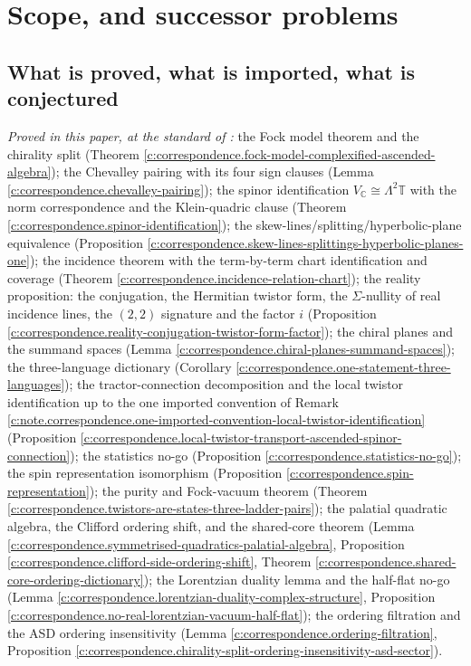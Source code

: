 \documentclass[11pt]{article}
\theoremstyle{definition}
\theoremstyle{plain}
\providecommand{\C}{}\renewcommand{\C}{\mathbb{C}}
\providecommand{\T}{}\renewcommand{\T}{\mathbb{T}}
\begin{document}
\section{Scope, and successor problems}

\subsection*{What is proved, what is imported, what is conjectured}
\label{c:note.correspondence.setting-what-proved-what-imported-what}
\emph{Proved in this paper, at the standard of \cite{ButlerT1}:} the Fock model theorem and the chirality split (Theorem \ref{c:correspondence.fock-model-complexified-ascended-algebra}); the Chevalley pairing with its four sign clauses (Lemma \ref{c:correspondence.chevalley-pairing}); the spinor identification $V_\C \cong \Lambda^2\T$ with the norm correspondence and the Klein-quadric clause (Theorem \ref{c:correspondence.spinor-identification}); the skew-lines/splitting/hyperbolic-plane equivalence (Proposition \ref{c:correspondence.skew-lines-splittings-hyperbolic-planes-one}); the incidence theorem with the term-by-term chart identification and coverage (Theorem \ref{c:correspondence.incidence-relation-chart}); the reality proposition: the conjugation, the Hermitian twistor form, the $\Sigma$-nullity of real incidence lines, the $(2,2)$ signature and the factor $i$ (Proposition \ref{c:correspondence.reality-conjugation-twistor-form-factor}); the chiral planes and the summand spaces (Lemma \ref{c:correspondence.chiral-planes-summand-spaces}); the three-language dictionary (Corollary \ref{c:correspondence.one-statement-three-languages}); the tractor-connection decomposition and the local twistor identification up to the one imported convention of Remark \ref{c:note.correspondence.one-imported-convention-local-twistor-identification} (Proposition \ref{c:correspondence.local-twistor-transport-ascended-spinor-connection}); the statistics no-go (Proposition \ref{c:correspondence.statistics-no-go}); the spin representation isomorphism (Proposition \ref{c:correspondence.spin-representation}); the purity and Fock-vacuum theorem (Theorem \ref{c:correspondence.twistors-are-states-three-ladder-pairs}); the palatial quadratic algebra, the Clifford ordering shift, and the shared-core theorem (Lemma \ref{c:correspondence.symmetrised-quadratics-palatial-algebra}, Proposition \ref{c:correspondence.clifford-side-ordering-shift}, Theorem \ref{c:correspondence.shared-core-ordering-dictionary}); the Lorentzian duality lemma and the half-flat no-go (Lemma \ref{c:correspondence.lorentzian-duality-complex-structure}, Proposition \ref{c:correspondence.no-real-lorentzian-vacuum-half-flat}); the ordering filtration and the ASD ordering insensitivity (Lemma \ref{c:correspondence.ordering-filtration}, Proposition \ref{c:correspondence.chirality-split-ordering-insensitivity-asd-sector}).
\end{document}
